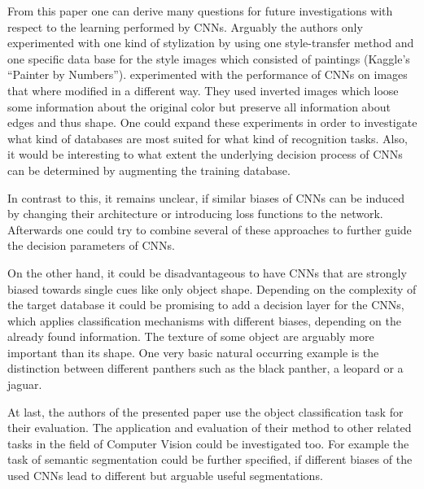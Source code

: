 \documentclass[runningheads,a4paper]{llncs}
\begin{document}
From this paper one can derive many questions for future investigations with respect to the learning performed by CNNs. Arguably the authors only experimented with one kind of stylization by using one style-transfer method \citep{huang2017arbitrary} and one specific data base for the style images which consisted of paintings (Kaggle's ``Painter by Numbers''). \citep{hosseini2018assessing} experimented with the performance of CNNs on images that where modified in a different way. They used inverted images which loose some information about the original color but preserve all information about edges and thus shape. One could expand these experiments in order to investigate what kind of databases are most suited for what kind of recognition tasks. Also, it would be interesting to what extent the underlying decision process of CNNs can be determined by augmenting the training database.

In contrast to this, it remains unclear, if similar biases of CNNs can be induced by changing their architecture or introducing loss functions to the network. Afterwards one could try to combine several of these approaches to further guide the decision parameters of CNNs.

On the other hand, it could be disadvantageous to have CNNs that are strongly biased towards single cues like only object shape. Depending on the complexity of the target database it could be promising to add a decision layer for the CNNs, which applies classification mechanisms with different biases, depending on the already found information. The texture of some object are arguably more important than its shape. One very basic natural occurring example is the distinction between different panthers such as the black panther, a leopard or a jaguar.

At last, the authors of the presented paper use the object classification task for their evaluation. The application and evaluation of their method to other related tasks in the field of Computer Vision could be investigated too. For example the task of semantic segmentation could be further specified, if different biases of the used CNNs lead to different but arguable useful segmentations.

\printbibliography
\end{document}
